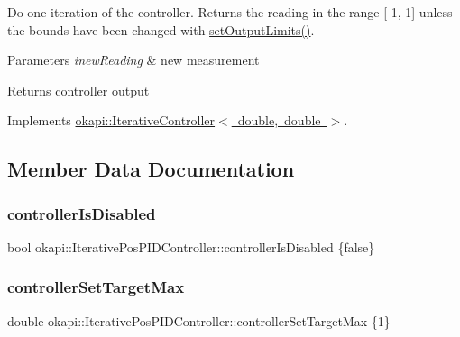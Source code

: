 Do one iteration of the controller. Returns the reading in the range \mbox{[}-\/1, 1\mbox{]} unless the bounds have been changed with \mbox{\hyperlink{classokapi_1_1IterativePosPIDController_a64c3fddb91ceaac4e747404afc5295ae}{set\+Output\+Limits()}}.


\begin{DoxyParams}{Parameters}
{\em inew\+Reading} & new measurement \\
\hline
\end{DoxyParams}
\begin{DoxyReturn}{Returns}
controller output 
\end{DoxyReturn}


Implements \mbox{\hyperlink{classokapi_1_1IterativeController_a751bcad1407099e629e3ffbe395daf2b}{okapi\+::\+Iterative\+Controller$<$ double, double $>$}}.



\subsection{Member Data Documentation}
\mbox{\label{classokapi_1_1IterativePosPIDController_a8e40c383cdba1a775dd73d366270cf83}} 
\subsubsection{\texorpdfstring{controllerIsDisabled}{controllerIsDisabled}}
{\footnotesize\ttfamily bool okapi\+::\+Iterative\+Pos\+P\+I\+D\+Controller\+::controller\+Is\+Disabled \{false\}\hspace{0.3cm}{\ttfamily [protected]}}

\mbox{\label{classokapi_1_1IterativePosPIDController_a1522e92d11f219b6c6d3b857774dab9e}} 
\subsubsection{\texorpdfstring{controllerSetTargetMax}{controllerSetTargetMax}}
{\footnotesize\ttfamily double okapi\+::\+Iterative\+Pos\+P\+I\+D\+Controller\+::controller\+Set\+Target\+Max \{1\}\hspace{0.3cm}{\ttfamily [protected]}}


